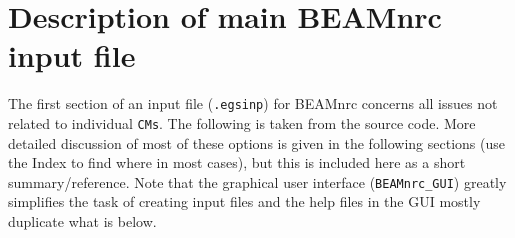 \documentclass[12pt,twoside]{article}
\begin{document}
\section{Description of main BEAMnrc input file}
\label{dmbif}
The first section of an input file (\verb+.egsinp+) for BEAMnrc concerns
all issues not related to individual \verb+CMs+.  The following is taken
from the source code. More detailed discussion of most of these options
is given in the following sections (use the Index to find where in most
cases), but this is included here as a short summary/reference. Note that
the graphical user interface ({\tt BEAMnrc\_GUI}) greatly
simplifies the task of creating input files\cite{TR99} and the help files
in the GUI mostly duplicate what is below.
 
\end{document}
